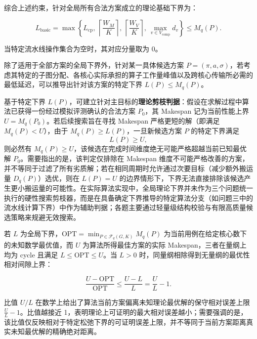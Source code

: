 \documentclass[anonymous,withtoc]{gmcm2026}
\begin{document}
综合上述约束，针对全局所有合法方案成立的理论基础下界为：

\begin{equation}
L_{\mathrm{basic}} = \max\left\{L_{\mathrm{cp}},\ \left\lceil\frac{W_M}{K}\right\rceil,\ \left\lceil\frac{W_V}{K}\right\rceil,\ \max_{v\in V_{\mathrm{comp}}}d_v\right\} \le M_q(P).
\end{equation}

当特定流水线操作集合为空时，其对应分量取为 0。

除了适用于全部方案的全局下界外，针对某一具体候选方案 \(P = (\pi, a, \sigma)\)，若考虑其特定的子图分配、各核心实际承担的算子工作量峰值以及跨核心传输所必需的最低延迟，可以推导出针对该方案的特定下界 \(L(P) \le M_q(P)\)。

基于特定下界 \(L(P)\)，可建立针对主目标的\textbf{理论剪枝判据}：假设在求解过程中算法已获得一份经过模拟评测确认的合法方案 \(P_0\)，其 Makespan 记为当前性能上界 \(U = M_q(P_0)\)。若后续搜索旨在寻找 Makespan 严格更短的解（即满足 \(M_q(P) < U\)），由于 \(M_q(P) \ge L(P)\)，一旦新候选方案 \(P\) 的特定下界满足 \begin{equation}
L(P) \ge U,
\end{equation} 则必然有 \(M_q(P) \ge U\)，该候选在完成时间维度绝无可能严格超越当前已知最优解 \(P_0\)。需要指出的是，该判定仅排除在 Makespan 维度不可能严格改善的方案，并不等同于过滤了所有劣质解；若在相同周期时允许通过次要目标（减少额外搬运量 \(D_q(P)\)）选优，则在 \(L(P) = U\) 的边界情形下，下界无法直接排除该候选产生更小搬运量的可能性。在实际算法实现中，全局理论下界并未作为三个问题统一执行的硬性搜索剪枝器，而是在具备确定下界推导的特定算法分支（如问题三中的流水线计算下界）中作为辅助判据；各题主要通过轻量级结构校验与有限高质量候选策略来规避无效搜索。

若 \(L\) 为全局下界，\(\mathrm{OPT} = \min_{P \in \mathcal{F}_q(G, K)} M_q(P)\) 为当前用例在给定核心数下的未知数学最优值，而 \(U\) 为算法所得最佳方案的实际 Makespan，三者在量纲上均为 cycle 且满足 \(L \le \mathrm{OPT} \le U\)。当 \(L > 0\) 时，同量纲相除得到无量纲的最优性相对间隙上界：

\begin{equation}
\frac{U - \mathrm{OPT}}{\mathrm{OPT}} \le \frac{U - L}{L} = \frac{U}{L} - 1.
\end{equation}

比值 \(U/L\) 在数学上给出了算法当前方案偏离未知理论最优解的保守相对误差上限 \(\frac{U}{L} - 1\)。比值越接近 1，表明理论上可证明的最大相对误差越小；需要强调的是，该比值仅反映相对于特定松弛下界的可证明误差上限，并不等同于当前方案距离真实未知最优解的精确绝对距离。
\end{document}

